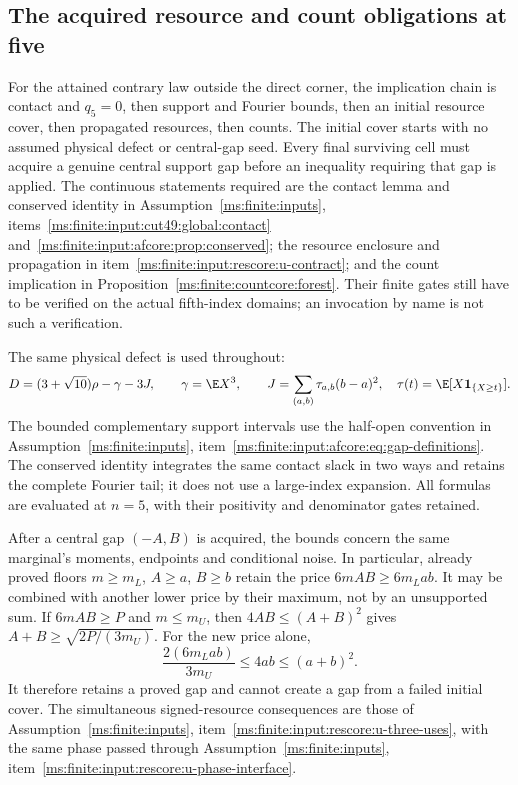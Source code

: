 \subsection{The acquired resource and count obligations at five}
\label{ms:finite:five:sec:acquired}

For the attained contrary law outside the direct corner, the implication
chain is contact and $q_5=0$, then support and Fourier bounds, then an
initial resource cover, then propagated resources, then counts.
The initial cover starts with no assumed physical defect or central-gap
seed. Every final surviving cell must acquire a genuine central support
gap before an inequality requiring that gap is applied.
The continuous statements required are the contact lemma and conserved identity
in Assumption~\ref{ms:finite:inputs}, items~\ref{ms:finite:input:cut49:global:contact}
and~\ref{ms:finite:input:afcore:prop:conserved}; the resource enclosure and
propagation in item~\ref{ms:finite:input:rescore:u-contract}; and the count
implication in Proposition~\ref{ms:finite:countcore:forest}. Their finite gates still have to be verified
on the actual fifth-index domains; an invocation by name is not such a
verification.

The same physical defect is used throughout:
\[
 D=(3+\sqrt{10})\rho-\gamma-3J,\qquad
 \gamma=\E X^3,\qquad J=\sum_{(a,b)}\tau_{a,b}(b-a)^2,
 \quad \tau(t)=\E[X\mathbf 1_{\{X\ge t\}}].
\]
The bounded complementary support intervals use the half-open convention
in Assumption~\ref{ms:finite:inputs}, item~\ref{ms:finite:input:afcore:eq:gap-definitions}. The conserved identity integrates
the same contact slack in two ways and retains the complete Fourier tail;
it does not use a large-index expansion. All formulas are evaluated at
$n=5$, with their positivity and denominator gates retained.

After a central gap $(-A,B)$ is acquired, the bounds concern the same
marginal's moments, endpoints and conditional noise. In particular,
already proved floors $m\ge m_L$, $A\ge a$, $B\ge b$ retain the price
$6mAB\ge6m_Lab$. It may be combined with another lower price by their
maximum, not by an unsupported sum. If $6mAB\ge P$ and $m\le m_U$,
then $4AB\le(A+B)^2$ gives $A+B\ge\sqrt{2P/(3m_U)}$.
For the new price alone,
\[
 \frac{2(6m_Lab)}{3m_U}\le4ab\le(a+b)^2.
\]
It therefore retains a proved gap and cannot create a gap from a failed
initial cover. The simultaneous signed-resource consequences are those
of Assumption~\ref{ms:finite:inputs}, item~\ref{ms:finite:input:rescore:u-three-uses}, with the same phase passed through
Assumption~\ref{ms:finite:inputs}, item~\ref{ms:finite:input:rescore:u-phase-interface}.

